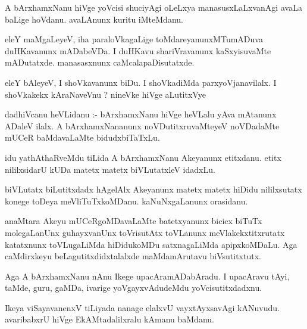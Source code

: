 \documentclass{article}
\begin{document}
\begin{mn}
A  bArxhamxNanu  hiVge  yoVcisi  shuciyAgi  oLeLxya  manasusxLaLxvanAgi  avaLa  baLige  hoVdanu.  avaLAnunx  kuritu  iMteMdanu.
\end{mn}

\begin{mn}
eleY  maMgaLeyeV,  iha paraloVkagaLige  toMdareyanunxMTumADuva  duHKavanunx  mADabeVDa.  I  duHKavu  shariVravanunx  
kaSxyisuvaMte  mADutatxde.  manasasxnunx  caMcalapaDisutatxde.
\end{mn}

\begin{mn}
eleY  bAleyeV,  I  shoVkavanunx  biDu.  I  shoVkadiMda  parxyoVjanavilalx.  I  shoVkakekx  kAraNaveVnu ?  
nineVke  hiVge  aLutitxVye
\end{mn}

\begin{mn}
dadhiVcanu  heVLidanu :- bArxhamxNanu  hiVge  heVLalu  yAva  mAtanunx  ADaleV  ilalx.  A  bArxhamxNananunx  
noVDutitxruvaMteyeV  noVDadaMte  mUCeR  baMdavaLaMte  bidudxbiTaTxLu.
\end{mn}

\begin{mn}
idu  yathAthaRveMdu  tiLida  A  bArxhamxNanu  Akeyanunx  etitxdanu.  etitx  nililxsidarU  kUDa  matetx  matetx  
biVLutatxleV  idadxLu.
\end{mn}

\begin{mn}
biVLutatx  biLutitxdadx  hAgelAlx  Akeyanunx  matetx  matetx  hiDidu  nililxsutatx  konege  toDeya  
meVliTuTxkoMDanu.  kaNuNxgaLanunx  orasidanu.
\end{mn}

\begin{mn}
anaMtara  Akeyu  mUCeRgoMDavaLaMte  batetxyanunx  bicicx  biTuTx  molegaLanUnx  guhayxvanUnx  toVrisutAtx  
toVLanunx  meVlakekxtitxrutatx  katatxnunx  toVLugaLiMda  hiDidukoMDu  satxnagaLiMda  apipxkoMDaLu.  Aga  
caMdirxkeyu  beLagutitxdidxtalalxde  maMdamArutavu  biVsutitxtutx.
\end{mn}

\begin{mn}
Aga  A  bArxhamxNanu  nAnu  Ikege  upacAramADabAradu.  I  upacAravu  tAyi,  taMde,  guru,  gaMDa,  ivarige  
yoVgayxvAdudeMdu  yoVcisutitxdadxnu.  
\end{mn}

\begin{mn}
Ikeya  viSayavanenxV  tiLiyada  nanage  elalxvU  vayxtAyxsavAgi  kANuvudu.  avaribabxrU  hiVge  EkAMtadalilxralu  kAmanu  baMdanu.
\end{mn}
\end{document}
